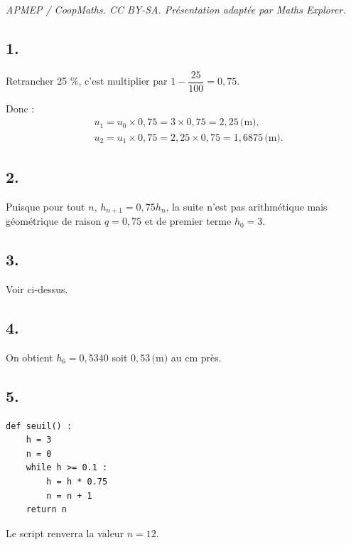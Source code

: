 \documentclass[10pt]{article}
\begin{document}
\noindent\textit{APMEP / CoopMaths. CC BY-SA. Présentation adaptée par Maths Explorer.}\par\medskip
\subsection*{1.}

Retrancher 25 \%, c'est multiplier par \(1 - \dfrac{25}{100} = 0{,}75\).

Donc :
\begin{align*}
&u_1 = u_0 \times 0{,}75 = 3 \times 0{,}75 = 2{,}25 \, \text{(m)}, \\
&u_2 = u_1 \times 0{,}75 = 2{,}25 \times 0{,}75 = 1{,}6875 \, \text{(m)}.
\end{align*}

\subsection*{2.}

Puisque pour tout \(n\), \(h_{n+1} = 0{,}75 h_n\), la suite n'est pas arithmétique mais géométrique de raison \(q = 0{,}75\) et de premier terme \(h_0 = 3\).

\subsection*{3.}

Voir ci-dessus.

\subsection*{4.}

On obtient \(h_6 = 0{,}5340\) soit \(0{,}53 \, \text{(m)}\) au cm près.

\subsection*{5.}

\begin{center}
\begin{lstlisting}[style=python]
def seuil() :
    h = 3
    n = 0
    while h >= 0.1 :
        h = h * 0.75
        n = n + 1
    return n
\end{lstlisting}
\end{center}

Le script renverra la valeur \(n = 12\).
\end{document}
